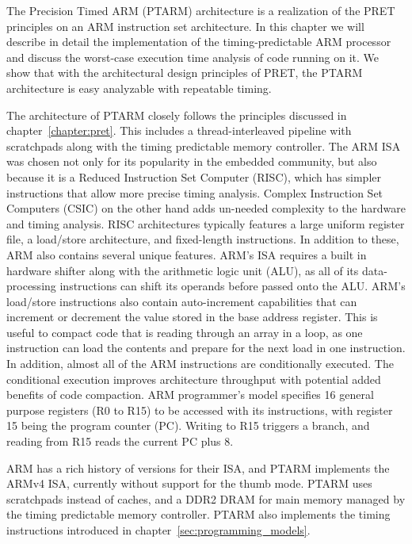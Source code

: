 The Precision Timed ARM (PTARM) architecture is a realization of the PRET principles on an ARM instruction set architecture. 
In this chapter we will describe in detail the implementation of the timing-predictable ARM processor and discuss the worst-case execution time analysis of code running on it.
We show that with the architectural design principles of PRET, the PTARM architecture is easy analyzable with repeatable timing.
  
The architecture of PTARM closely follows the principles discussed in chapter~\ref{chapter:pret}.
This includes a thread-interleaved pipeline with scratchpads along with the timing predictable memory controller.
The ARM ISA was chosen not only for its popularity in the embedded community, but also because it is a Reduced Instruction Set Computer (RISC), which has simpler instructions that allow more precise timing analysis. 
Complex Instruction Set Computers (CSIC) on the other hand adds un-needed complexity to the hardware and timing analysis.
RISC architectures typically features a large uniform register file, a load/store architecture, and fixed-length instructions.
In addition to these, ARM also contains several unique features.
ARM's ISA requires a built in hardware shifter along with the arithmetic logic unit (ALU), as all of its data-processing instructions can shift its operands before passed onto the ALU. 
ARM's load/store instructions also contain auto-increment capabilities that can increment or decrement the value stored in the base address register. 
This is useful to compact code that is reading through an array in a loop, as one instruction can load the contents and prepare for the next load in one instruction.
In addition, almost all of the ARM instructions are conditionally executed.
The conditional execution improves architecture throughput with potential added benefits of code compaction.     
ARM programmer's model specifies 16 general purpose registers (R0 to R15) to be accessed with its instructions, with register 15 being the program counter (PC). 
Writing to R15 triggers a branch, and reading from R15 reads the current PC plus 8.

ARM has a rich history of versions for their ISA, and PTARM implements the ARMv4 ISA, currently without support for the thumb mode.
PTARM uses scratchpads instead of caches, and a DDR2 DRAM for main memory managed by the timing predictable memory controller.
PTARM also implements the timing instructions introduced in chapter~\ref{sec:programming_models}.   


